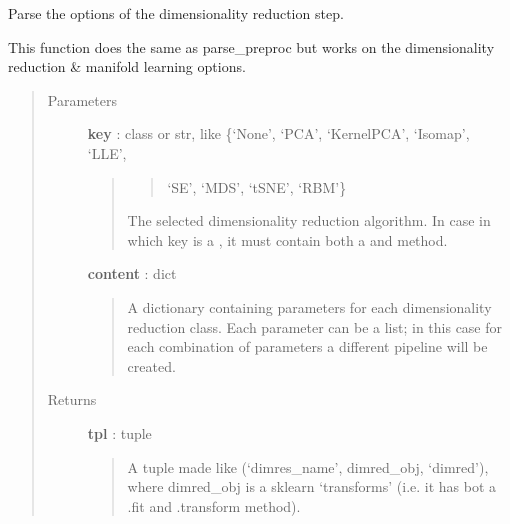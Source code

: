 \documentclass[letterpaper,10pt,english]{sphinxmanual}
\begin{document}
\begin{fulllineitems}
\label{index:adenine.core.define_pipeline.parse_dimred}
Parse the options of the dimensionality reduction step.

This function does the same as parse\_preproc but works on the
dimensionality reduction \& manifold learning options.
\begin{quote}\begin{description}
\item[{Parameters}] \leavevmode
\textbf{key} : class or str, like \{`None', `PCA', `KernelPCA', `Isomap', `LLE',
\begin{quote}
\begin{quote}

`SE', `MDS', `tSNE', `RBM'\}
\end{quote}

The selected dimensionality reduction algorithm. In case in which key
is a , it must contain both a  and  method.
\end{quote}

\textbf{content} : dict
\begin{quote}

A dictionary containing parameters for each dimensionality reduction
class. Each parameter can be a list; in this case for each combination
of parameters a different pipeline will be created.
\end{quote}

\item[{Returns}] \leavevmode
\textbf{tpl} : tuple
\begin{quote}

A tuple made like (`dimres\_name', dimred\_obj, `dimred'), where
dimred\_obj is a sklearn `transforms' (i.e. it has bot a .fit and .transform method).
\end{quote}

\end{description}\end{quote}

\end{fulllineitems}

\end{document}
